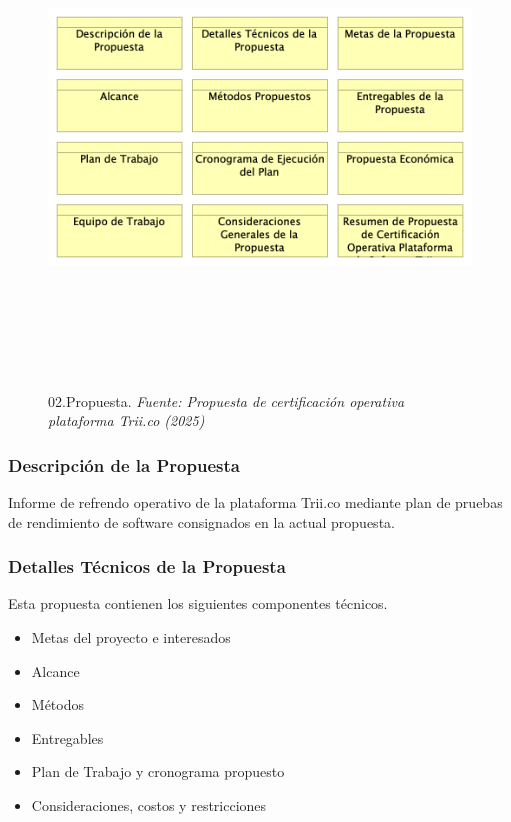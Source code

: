 \documentclass[
  paper=a4,
  ,captions=tableheading
]{scrartcl}
\providecommand{\tightlist}{%
  \setlength{\itemsep}{0pt}\setlength{\parskip}{0pt}}
\begin{document}
\begin{figure}
\centering
\includegraphics[width=\textwidth,height=5.20833in]{images/02.Propuesta.png}
\caption{02.Propuesta. \emph{Fuente: Propuesta de certificación
operativa plataforma Trii.co
(2025)}}\label{fig:id-dd2f1c1c1816447380fe900b66faa8bc}
\end{figure}

\subsubsection{Descripción de la
Propuesta}\label{sec:descripciuxf3n-de-la-propuesta}

Informe de refrendo operativo de la plataforma Trii.co mediante plan de
pruebas de rendimiento de software consignados en la actual propuesta.

\subsubsection{Detalles Técnicos de la
Propuesta}\label{sec:detalles-tuxe9cnicos-de-la-propuesta}

Esta propuesta contienen los siguientes componentes técnicos.

\begin{itemize}
\tightlist
\item
  Metas del proyecto e interesados
\item
  Alcance
\item
  Métodos
\item
  Entregables
\item
  Plan de Trabajo y cronograma propuesto
\item
  Consideraciones, costos y restricciones
\end{itemize}
\end{document}
